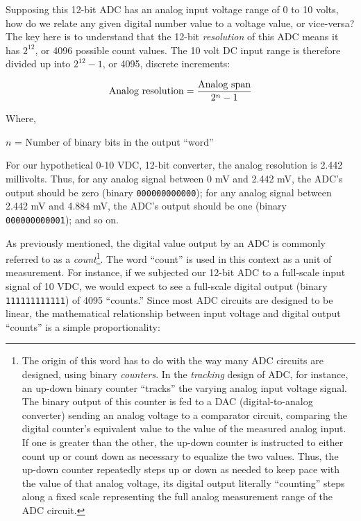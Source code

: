 Supposing this 12-bit ADC has an analog input voltage range of 0 to 10 volts, how do we relate any given digital number value to a voltage value, or vice-versa?  The key here is to understand that the 12-bit \textit{resolution} of this ADC means it has $2^{12}$, or 4096 possible count values.  The 10 volt DC input range is therefore divided up into $2^{12} - 1$, or 4095, discrete increments:

$$\hbox{Analog resolution} = {\hbox{Analog span} \over {2^n - 1}}$$

\noindent
Where,

$n$ = Number of binary bits in the output ``word''

\vskip 10pt

For our hypothetical 0-10 VDC, 12-bit converter, the analog resolution is 2.442 millivolts.  Thus, for any analog signal between 0 mV and 2.442 mV, the ADC's output should be zero (binary \texttt{000000000000}); for any analog signal between 2.442 mV and 4.884 mV, the ADC's output should be one (binary \texttt{000000000001}); and so on.

\filbreak

As previously mentioned, the digital value output by an ADC is commonly referred to as a \textit{count}\footnote{The origin of this word has to do with the way many ADC circuits are designed, using binary \textit{counters}.  In the \textit{tracking} design of ADC, for instance, an up-down binary counter ``tracks'' the varying analog input voltage signal.  The binary output of this counter is fed to a DAC (digital-to-analog converter) sending an analog voltage to a comparator circuit, comparing the digital counter's equivalent value to the value of the measured analog input.  If one is greater than the other, the up-down counter is instructed to either count up or count down as necessary to equalize the two values.  Thus, the up-down counter repeatedly steps up or down as needed to keep pace with the value of that analog voltage, its digital output literally ``counting'' steps along a fixed scale representing the full analog measurement range of the ADC circuit.}.  The word ``count'' is used in this context as a unit of measurement.  For instance, if we subjected our 12-bit ADC to a full-scale input signal of 10 VDC, we would expect to see a full-scale digital output (binary \texttt{111111111111}) of 4095 ``counts.''  Since most ADC circuits are designed to be linear, the mathematical relationship between input voltage and digital output ``counts'' is a simple proportionality: 


